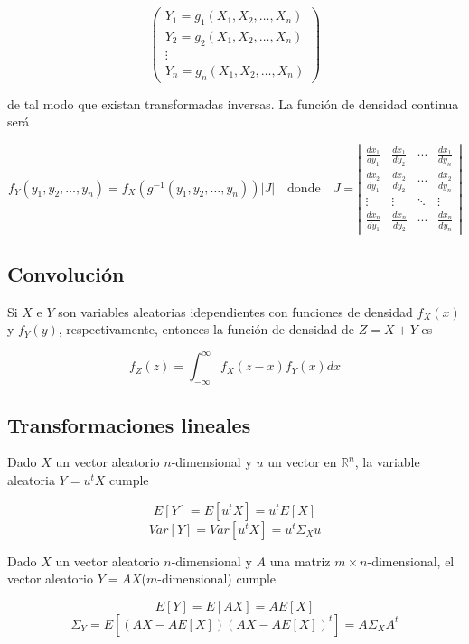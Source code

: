 \documentclass{article}
\begin{document}
\[ \left( \begin{matrix}
    Y_1 = g_1(X_1,X_2,\dots,X_n) \\
    Y_2 = g_2(X_1,X_2,\dots,X_n) \\
    \vdots \\
    Y_n = g_n(X_1,X_2,\dots,X_n)
\end{matrix} \right) \]

de tal modo que existan transformadas inversas. La función de densidad continua será

\[ f_Y(y_1, y_2, \dots, y_n) = f_X(g^{-1}(y_1, y_2, \dots, y_n))|J| \quad \text{donde} \quad J = 
\left| \begin{matrix}
    \frac{dx_1}{dy_1} & \frac{dx_1}{dy_2} & \cdots & \frac{dx_1}{dy_n} \\
    \frac{dx_2}{dy_1} & \frac{dx_2}{dy_2} & \cdots & \frac{dx_2}{dy_n} \\
    \vdots & \vdots & \ddots & \vdots \\
    \frac{dx_n}{dy_1} & \frac{dx_n}{dy_2} & \cdots & \frac{dx_n}{dy_n}
\end{matrix} \right| \]


\newpage

\subsection{Convolución}

Si $X$ e $Y$ son variables aleatorias idependientes con funciones de densidad $f_X(x)$ y $f_Y(y)$, respectivamente, entonces la función de densidad de 
$Z = X + Y$ es

\[ f_Z(z) = \int_{-\infty}^{\infty}f_{X}(z - x)f_{Y}(x)dx \]

\subsection{Transformaciones lineales}

Dado $X$ un vector aleatorio $n$-dimensional y $u$ un vector en $\mathbb{R}^n$, la variable aleatoria $Y = u^tX$ cumple

\[ E[Y] = E[u^tX] = u^tE[X] \]
\[ Var[Y] = Var[u^tX] = u^t\Sigma_Xu \]

Dado $X$ un vector aleatorio $n$-dimensional y $A$ una matriz $m \times n$-dimensional, el vector aleatorio $Y = AX$($m$-dimensional) cumple

\[ E[Y] = E[AX] = AE[X] \]
\[ \Sigma_Y = E[(AX - AE[X])(AX - AE[X])^t] = A\Sigma_XA^t \]

\newpage
\end{document}
